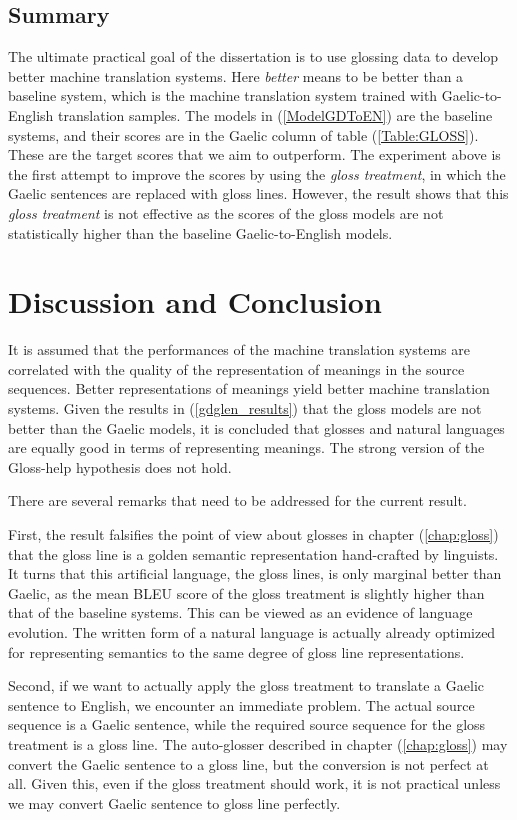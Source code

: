 \documentclass[final]{ua-thesis}
\numberwithin{equation}{section}
\begin{document}
\subsection{Summary}
The ultimate practical goal of the dissertation is to use glossing data to develop better machine translation systems. Here \textit{better} means to be better than a baseline system, which is the machine translation system trained with Gaelic-to-English translation samples. The models in (\ref{ModelGDToEN}) are the baseline systems, and their scores are in the Gaelic column of table (\ref{Table:GLOSS}). These are the target scores that we aim to outperform. The experiment above is the first attempt to improve the scores by using the \textit{gloss treatment}, in which the Gaelic sentences are replaced with gloss lines.  However, the result shows that this \textit{gloss treatment} is not effective as the scores of the gloss models are not statistically higher than the baseline Gaelic-to-English models. 

\section{Discussion and Conclusion}\label{section:cake1_Discussion}
It is assumed that the performances of the machine translation systems are correlated with the quality of the representation of meanings in the source sequences. Better representations of meanings yield better machine translation systems. Given the results in (\ref{gdglen_results}) that the gloss models are not better than the Gaelic models, it is concluded that glosses and natural languages are equally good in terms of representing meanings. The strong version of the Gloss-help hypothesis does not hold.

There are several remarks that need to be addressed for the current result. 

First, the result falsifies the point of view about glosses in chapter (\ref{chap:gloss}) that the gloss line is a golden semantic representation hand-crafted by linguists.
It turns that this artificial language, the gloss lines, is only marginal better than Gaelic, as the mean BLEU score of the gloss treatment is slightly higher than that of the baseline systems. This can be viewed as an evidence of language evolution.
The written form of a natural language is actually already optimized for representing semantics to the same degree of gloss line representations.

Second, if we want to actually apply the gloss treatment to translate a Gaelic sentence to English, we encounter an immediate problem. The actual source sequence is a Gaelic sentence, while the required source sequence for the gloss treatment is a gloss line. The auto-glosser described in chapter (\ref{chap:gloss}) may convert the Gaelic sentence to a gloss line, but the conversion is not perfect at all. Given this, even if the gloss treatment should work, it is not practical unless we may convert Gaelic sentence to gloss line perfectly.      
\end{document}
